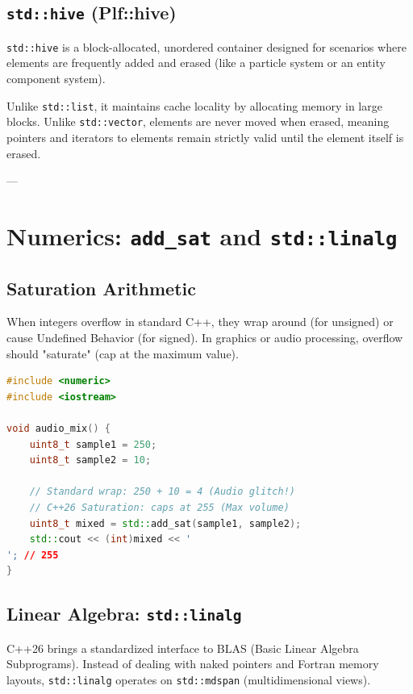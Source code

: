 \subsection{\texttt{std::hive} (Plf::hive)}

\texttt{std::hive} is a block-allocated, unordered container designed for scenarios where elements are frequently added and erased (like a particle system or an entity component system).

Unlike \texttt{std::list}, it maintains cache locality by allocating memory in large blocks.
Unlike \texttt{std::vector}, elements are never moved when erased, meaning pointers and iterators to elements remain strictly valid until the element itself is erased.

---

\section{Numerics: \texttt{add_sat} and \texttt{std::linalg}}

\subsection{Saturation Arithmetic}

When integers overflow in standard C++, they wrap around (for unsigned) or cause Undefined Behavior (for signed). In graphics or audio processing, overflow should "saturate" (cap at the maximum value).

\begin{lstlisting}[language=C++]
#include <numeric>
#include <iostream>

void audio_mix() {
    uint8_t sample1 = 250;
    uint8_t sample2 = 10;
    
    // Standard wrap: 250 + 10 = 4 (Audio glitch!)
    // C++26 Saturation: caps at 255 (Max volume)
    uint8_t mixed = std::add_sat(sample1, sample2);
    std::cout << (int)mixed << '
'; // 255
}
\end{lstlisting}

\subsection{Linear Algebra: \texttt{std::linalg}}

C++26 brings a standardized interface to BLAS (Basic Linear Algebra Subprograms). Instead of dealing with naked pointers and Fortran memory layouts, \texttt{std::linalg} operates on \texttt{std::mdspan} (multidimensional views).

